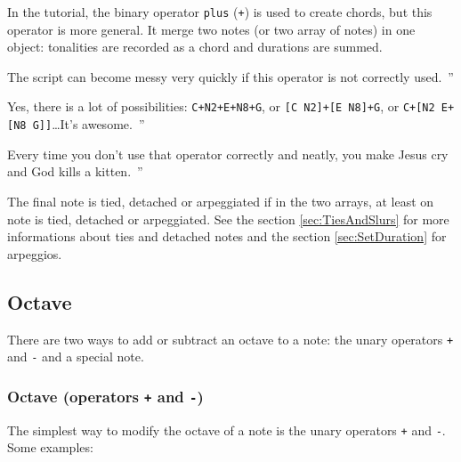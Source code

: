 \documentclass{article}
\newcommand{\wikipedia}{\textsc{Wikipedia}\xspace}
\newcommand{\wiktionary}{\textsc{Wiktionary}\xspace}
\newcommand{\google}{\textsc{Google}\xspace}
\newcommand{\footurl}[1]{\footnote{\url{#1}}\xspace}
\newenvironment{meenv}{ \par \noindent \makebox[6em][r]{ \textcolor{mecolor}{Me}: `` --~}}{~''}
\newenvironment{myselfenv}{ \par \noindent \makebox[6em][r]{ \textcolor{myselfcolor}{Myself}: `` --~}}{~''}
\newcommand{\me}[1]{\begin{meenv}#1\end{meenv}}
\newcommand{\myself}[1]{\begin{myselfenv}#1\end{myselfenv}}
\begin{document}
In the tutorial, the binary operator \lstinline!plus! (\lstinline!+!) is used to create chords, but this operator is more general. It merge two notes (or two array of notes) in one object: tonalities are recorded as a chord and durations are summed.

\myself{The script can become messy very quickly if this operator is not correctly used.}
\me{Yes, there is a lot of possibilities: \lstinline!C+N2+E+N8+G!, or \lstinline![C N2]+[E N8]+G!, or \lstinline!C+[N2 E+[N8 G]]!\dots It's awesome.}
\myself{Every time you don't use that operator correctly and neatly, you make Jesus cry and God kills a kitten.}

The final note is tied, detached or arpeggiated if in the two arrays, at least on note is tied, detached or arpeggiated. See the section \ref{sec:TiesAndSlurs} for more informations about ties and detached notes and the section \ref{sec:SetDuration} for arpeggios.


\subsection{Octave}
\label{sec:Octave}

There are two ways to add or subtract an octave to a note: the unary operators \lstinline!+! and \lstinline!-! and a special note.

\subsubsection{Octave (operators \lstinline!+! and \lstinline!-!)}
\label{sec:OctaveOperators}

The simplest way to modify the octave of a note is the unary operators \lstinline!+! and \lstinline!-!. Some examples: \\
\end{document}
